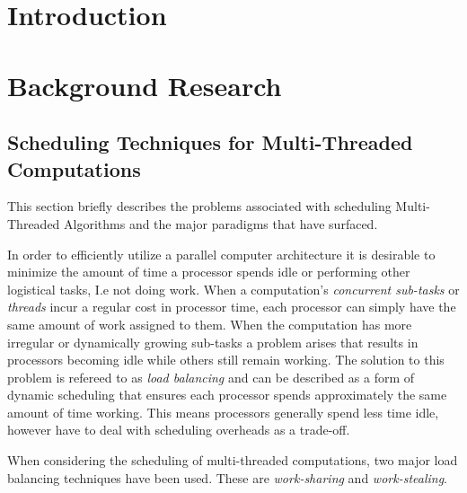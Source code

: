 \chapter{Introduction}

\chapter{Background Research}

\section{Scheduling Techniques for Multi-Threaded Computations}
This section briefly describes the problems associated with scheduling Multi-Threaded Algorithms and 
the major paradigms that have surfaced.

In order to efficiently utilize a parallel computer architecture it is desirable to minimize
the amount of time a processor spends idle or performing other logistical tasks, I.e not doing work. 
When a computation's \textit{concurrent sub-tasks} or \textit{threads} incur a regular cost in processor
time, each processor can simply have the same amount of work assigned to them. When the computation has
more irregular or dynamically growing sub-tasks a problem arises that results in 
processors becoming idle while others still remain working. The solution to this problem is refereed to as
\textit{load balancing} and can be described as a form of dynamic scheduling that ensures each processor 
spends approximately the same amount of time working. This means processors generally spend
less time idle, however have to deal with scheduling overheads as a trade-off.

When considering the scheduling of multi-threaded computations, two major load balancing techniques have been used.
These are \textit{work-sharing} and \textit{work-stealing}.

